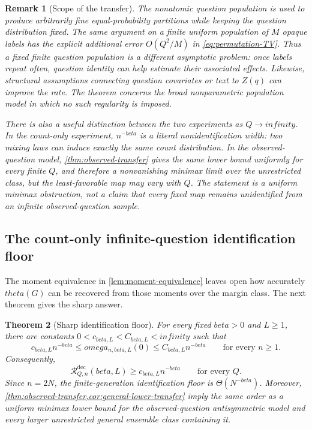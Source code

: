 \documentclass[11pt]{article}
\def\beta{beta}%
\def\theta{theta}%
\def\omega{omega}%
\def\infty{infinity}%
\newtheorem{theorem}{Theorem}[section]
\newtheorem{remark}[theorem]{Remark}
\newcommand{\calR}{\mathcal R}
\newcommand\ced[1]{{\color{teal!70!black} #1}}
\begin{document}
\begin{remark}[Scope of the transfer]
\label{rem:nonatomic}
The nonatomic question population is used to produce arbitrarily fine equal-probability partitions while keeping the question distribution fixed.  The same argument on a finite uniform population of $M$ opaque labels has the explicit additional error $O(Q^2/M)$ in \eqref{eq:permutation-TV}.  Thus a fixed finite question population is a different asymptotic problem: once labels repeat often, question identity can help estimate their associated effects.  Likewise, structural assumptions connecting question covariates or text to $Z(q)$ can improve the rate.  The theorem concerns the broad nonparametric population model in which no such regularity is imposed.

There is also a useful distinction between the two experiments as $Q\to\infty$.  In the count-only experiment, $n^{-\beta}$ is a literal nonidentification width: two mixing laws can induce exactly the same count distribution.  In the observed-question model, \cref{thm:observed-transfer} gives the same lower bound uniformly for every finite $Q$, and therefore a nonvanishing minimax limit over the unrestricted class, but the least-favorable map may vary with $Q$.  The statement is a uniform minimax obstruction, not a claim that every fixed map remains unidentified from an infinite observed-question sample.
\end{remark}


\subsection{The count-only infinite-question identification floor}

\ced{The moment equivalence in \cref{lem:moment-equivalence} leaves open how accurately $\theta(G)$ can be recovered from those moments over the margin class.  The next theorem gives the sharp answer.}

\begin{theorem}[Sharp identification floor]
\label{thm:identification-floor}
For every fixed $\beta>0$ and $L\ge1$, there are constants $0<c_{\beta,L}<C_{\beta,L}<\infty$ such that
\begin{equation}
\label{eq:identification-floor}
 c_{\beta,L}n^{-\beta}
\le
\omega_{n,\beta,L}(0)
\le
C_{\beta,L}n^{-\beta}
\qquad\text{for every }n\ge1.
\end{equation}
Consequently,
\begin{equation}
\label{eq:N-only-lower}
\calR^{\mathrm{dec}}_{Q,n}(\beta,L)
\ge c_{\beta,L}n^{-\beta}
\qquad\text{for every }Q.
\end{equation}
Since $n=2N$, the finite-generation identification floor is $\Theta(N^{-\beta})$.
Moreover, \cref{thm:observed-transfer,cor:general-lower-transfer} imply the same order as a uniform minimax lower bound for the observed-question antisymmetric model and every larger unrestricted general ensemble class containing it.
\end{theorem}
\end{document}
